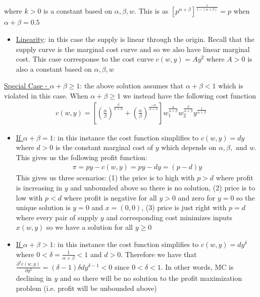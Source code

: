 \documentclass{article}
\begin{document}
  where $k > 0$ is a constant based on $\alpha, \beta, w$. This is as $[p^{\alpha + \beta}]^{\tfrac{1}{1-(\alpha + \beta)}} = p$ when $\alpha + \beta = 0.5$
  \begin{itemize}
    \item  \underline{Linearity}: in this case the supply is linear through the origin. Recall that the supply curve is the marginal cost curve and so we also have linear marginal cost. This case corresponse to the cost curve $c(w,y) = Ay^{2}$ where $A > 0$ is also a constant based on $\alpha, \beta, w$
  \end{itemize}
  \par
  \underline{Special Case - $\alpha + \beta \geq 1$}: the above solution assumes that $\alpha + \beta < 1$ which is violated in this case. When $\alpha + \beta \geq 1$ we instead have the following cost function
  \begin{gather*}
    c(w,y) = [(\frac{\alpha}{\beta})^{\tfrac{\beta}{\alpha + \beta}} + (\frac{\alpha}{\beta})^{\tfrac{- \alpha}{\alpha + \beta}}]w_{1}^{\tfrac{\alpha}{\alpha + \beta}} w_{2}^{\tfrac{\beta}{\alpha + \beta}} y^{\tfrac{1}{\alpha + \beta}}
  \end{gather*}
  \begin{itemize}
    \item  \underline{If $\alpha + \beta = 1$}: in this instance the cost function simplifies to $c(w,y) = dy$ where $d > 0$ is the constant marginal cost of $y$ which depends on $\alpha, \beta, \text{ and } w$. This gives us the following profit function:
    \begin{gather*}
      \pi = py - c(w,y) = py - dy = (p-d)y
    \end{gather*}
    This gives us three scenarios: (1) the price is to high with $p > d$ where profit is increasing in $y$ and unbounded above so there is no solution, (2) price is to low with $p < d$ where profit is negative for all $y > 0$ and zero for $y = 0$ so the unique solution is $y = 0$ and $x = (0,0)$, (3) price is just right with $p = d$ where every pair of supply $y$ and corresponding cost minimizes inputs $x(w,y)$ so we have a solution for all $y \geq 0$
    \item  \underline{If $\alpha + \beta > 1$}: in this instance the cost function simplifies to $c(w,y) = dy^{\delta}$ where $0 < \delta = \tfrac{1}{\alpha + \beta} < 1$ and $d > 0$. Therefore we have that $\tfrac{\partial^{2} c(w,y)}{\partial y^{2}} = (\delta - 1)\delta d y^{\delta - 1} < 0$ since $0 < \delta < 1$. In other words, MC is declining in $y$ and so there will be no solution to the profit maximization problem (i.e. profit will be unbounded above)
  \end{itemize}
\vspace{6mm}
\end{document}

